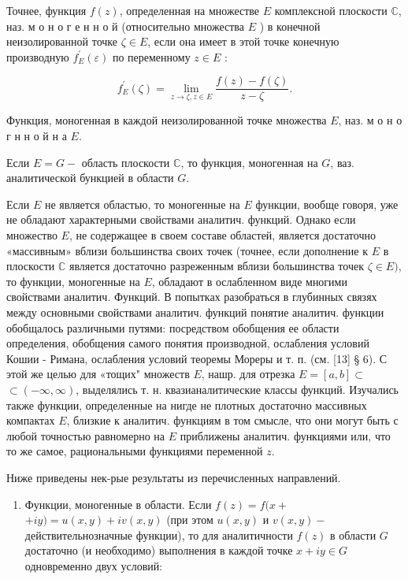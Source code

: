 \documentclass[10pt]{article}
\begin{document}
Точнее, функция $f(z)$, определенная на множестве $E$ комплексной плоскости $\mathbb{C}$, наз. м о н о г е н н о й (относительно множества $E$ ) в конечной неизолированной точке $\zeta \in E$, если она имеет в этой точке конечную производную $f_{E}^{\prime}(\varepsilon)$ по переменному $z \in E$ :



\[

f_{E}^{\prime}(\zeta)=\lim _{z \rightarrow \zeta, z \in E} \frac{f(z)-f(\zeta)}{z-\zeta} .

\]



Функция, моногенная в каждой неизолированной точке множества $E$, наз. м о н о г н н о й н а $E$.



Если $E=G-$ область плоскости $\mathbb{C}$, то функция, моногенная на $G$, ваз. аналитической бункцией в области $G$.



Если $E$ не является областью, то моногенные на $E$ функции, вообще говоря, уже не обладают характерными свойствами аналитич. функций. Однако если множество $E$, не содержащее в своем составе областей, является достаточно «массивным» вблизи большинства своих точек (точнее, если дополнение к $E$ в плоскости $\mathbb{C}$ является достаточно разреженным вблизи большинства точек $\zeta \in E)$, то функции, моногенные на $E$, обладают в ослабленном виде многими свойствами аналитич. Функций. В попытках разобраться в глубинных связях между основными свойствами аналитич. функций понятие аналитич. функции обобщалось различными путями: посредством обобщения ее области определения, обобщения самого понятия производной, ослабления условий Кошии - Римана, ослабления условий теоремы Мореры и т. п. (см. [13] § 6). С этой же целью для «тощих" множеств $E$, нашр. для отрезка $E=[a, b] \subset$ $\subset(-\infty, \infty)$, выделялись т. н. квазианалитические классы функций. Изучались также функции, определенные на нигде не плотных достаточно массивных компактах $E$, близкие к аналитич. функциям в том смысле, что они могут быть с любой точностью равномерно на $E$ приближены аналитич. функциями или, что то же самое, рациональными функциями переменной $z$.



Ниже приведены нек-рые результаты из перечисленных направлений.



\begin{enumerate}

  \item Функции, моногенные в области. Если $f(z)=f(x+$ $+i y)=u(x, y)+i v(x, y)$ (при этом $u(x, y)$ и $v(x, y)-$ действительнозначные функции), то для аналитичности $f(z)$ в области $G$ достаточно (и необходимо) выполнения в каждой точке $x+i y \in G$ одновременно двух условий:

\end{enumerate}
\end{document}
